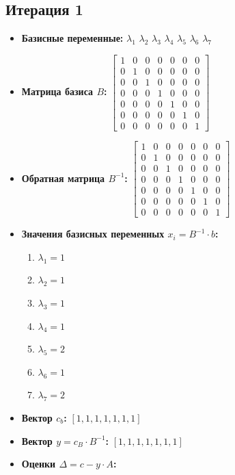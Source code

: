 \begin{itemize}
\subsection*{Итерация 1}
\begin{itemize}
\item \textbf{Базисные переменные:}
$\lambda_1$
$\lambda_2$
$\lambda_3$
$\lambda_4$
$\lambda_5$
$\lambda_6$
$\lambda_7$
\item \textbf{Матрица базиса $B$:}
$\left[\begin{matrix}1 & 0 & 0 & 0 & 0 & 0 & 0\\0 & 1 & 0 & 0 & 0 & 0 & 0\\0 & 0 & 1 & 0 & 0 & 0 & 0\\0 & 0 & 0 & 1 & 0 & 0 & 0\\0 & 0 & 0 & 0 & 1 & 0 & 0\\0 & 0 & 0 & 0 & 0 & 1 & 0\\0 & 0 & 0 & 0 & 0 & 0 & 1\end{matrix}\right]$
\item \textbf{Обратная матрица $B^{-1}$:}
$\left[\begin{matrix}1 & 0 & 0 & 0 & 0 & 0 & 0\\0 & 1 & 0 & 0 & 0 & 0 & 0\\0 & 0 & 1 & 0 & 0 & 0 & 0\\0 & 0 & 0 & 1 & 0 & 0 & 0\\0 & 0 & 0 & 0 & 1 & 0 & 0\\0 & 0 & 0 & 0 & 0 & 1 & 0\\0 & 0 & 0 & 0 & 0 & 0 & 1\end{matrix}\right]$
\item \textbf{Значения базисных переменных $ x_i = B^{-1} \cdot b$:}
\begin{enumerate}
\item $\lambda_1 = 1$
\item $\lambda_2 = 1$
\item $\lambda_3 = 1$
\item $\lambda_4 = 1$
\item $\lambda_5 = 2$
\item $\lambda_6 = 1$
\item $\lambda_7 = 2$
\end{enumerate}
\item \textbf{Вектор $c_b$:}
$[1, 1, 1, 1, 1, 1, 1]$
\item \textbf{Вектор $y = c_B \cdot B^{-1}$:}
$[1, 1, 1, 1, 1, 1, 1]$
\item \textbf{Оценки $\Delta = c - y \cdot A$:}

\end{itemize}
\end{itemize}
